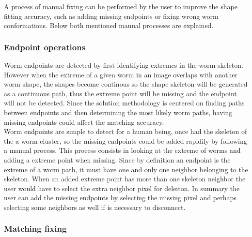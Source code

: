 A process of manual fixing can be performed by the user to improve the shape fitting
accuracy, such as adding missing endpoints or fixing wrong worm conformations. Below
both mentioned manual processes are explained. 

\subsubsection{Endpoint operations}
\label{sec:endpointop}

Worm endpoints are detected by first identifying extremes in the worm
skeleton. However when the extreme of a given worm in an image overlaps with 
another worm shape, the shapes become continous so the shape skeleton will be generated 
as a continuous path, thus the extreme point will be missing and the endpoint will not be 
detected. Since the solution methodology is centered on finding paths between endpoints and 
then determining the most likely worm paths, having missing endpoints could affect 
the matching accuracy.\\

Worm endpoints are simple to detect for a human being, once had the skeleton of the 
a worm cluster, so the missing endpoints could be added rapidily by following a manual
process. This process consists in looking at the extreme of worms and adding a 
extreme point when missing. Since by definition an endpoint is the extreme of a worm path,
it must have one and only one neighbor belonging to the skeleton. When an added extreme
point has more than one skeleton neighbor the user would have to select the extra
neighbor pixel for deleiton.
In summary the user can add the missing endpoints by selecting the missing pixel
and perhaps selecting some neighbors as well if is necessary to disconnect. 

\subsubsection{Matching fixing}
\label{sec:matchfix}

